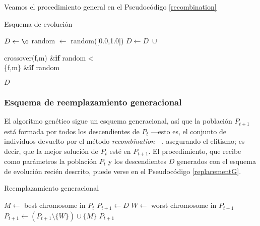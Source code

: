 \documentclass[a4paper, 11pt, titlepage]{article}
\begin{document}
    Veamos el procedimiento general en el Pseudocódigo \ref{recombination}

    \begin{algorithm}
        \caption{Esquema de evolución}\label{recombination}
        \begin{algorithmic}[1]
             
            \State $D \gets \o$ 
             
                \State random $\gets$ random([0.0,1.0])
                \State $D \gets D\; \cup$ \begin{cases}
                    crossover(f,m) &\textrm{\textbf{if} } random < \alpha \\
                    \{f,m\} &\textrm{\textbf{if} } random \geq \alpha
                \end{cases}
            \EndFor
            \State \Return $D$
            \EndFunction
        \end{algorithmic}
    \end{algorithm}

    \subsubsection*{Esquema de reemplazamiento generacional}
    El algoritmo genético sigue un esquema generacional, así que la población $P_{t+1}$ está formada por todos los descendientes de $P_t$ ---esto es, el conjunto de individuos devuelto por el método \emph{recombination}---, asegurando el elitismo; es decir, que la mejor solución de $P_t$ esté en $P_{t+1}$. El procedimiento, que recibe como parámetros la población $P_t$ y los descendientes $D$ generados con el esquema de evolución recién descrito, puede verse en el Pseudocódigo \ref{replacementG}.

    \begin{algorithm}
        \caption{Reemplazamiento generacional}\label{replacementG}
        \begin{algorithmic}[1]
             
            \State $M \gets$ best chromosome in $P_t$
            \State $P_{t+1} \gets D$
                \State $W \gets$ worst chromosome in $P_{t+1}$
                \State $P_{t+1} \gets (P_{t+1} \setminus \{W\}) \cup \{M\}$
            \EndIf
            \State \Return $P_{t+1}$
            \EndFunction
        \end{algorithmic}
    \end{algorithm}
\end{document}
